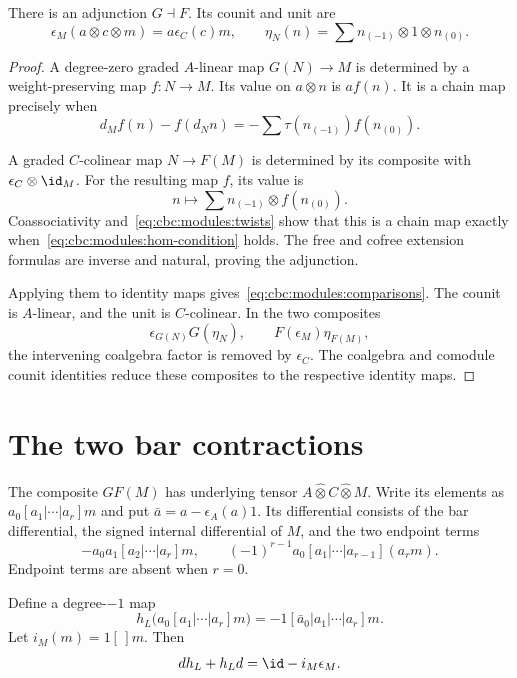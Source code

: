 \begin{proposition}\label{cbc:modules:adjunction}
There is an adjunction $G\dashv F$.
Its counit and unit are
\begin{equation}\label{eq:cbc:modules:comparisons}
 \epsilon_M(a\otimes c\otimes m)=a\epsilon_C(c)m,
 \qquad
 \eta_N(n)=\sum n_{(-1)}\otimes1\otimes n_{(0)}.
\end{equation}
\end{proposition}
\begin{proof}
A degree-zero graded $A$-linear map $G(N)\to M$ is determined by a weight-preserving map $f:N\to M$.
Its value on $a\otimes n$ is $af(n)$.
It is a chain map precisely when
\begin{equation}\label{eq:cbc:modules:hom-condition}
 d_Mf(n)-f(d_Nn)=-\sum\tau(n_{(-1)})f(n_{(0)}).
\end{equation}

A graded $C$-colinear map $N\to F(M)$ is determined by its composite with $\epsilon_C\otimes\id_M$.
For the resulting map $f$, its value is
\[
 n\longmapsto\sum n_{(-1)}\otimes f(n_{(0)}).
\]
Coassociativity and~\eqref{eq:cbc:modules:twists} show that this is a chain map exactly when~\eqref{eq:cbc:modules:hom-condition} holds.
The free and cofree extension formulas are inverse and natural, proving the adjunction.

Applying them to identity maps gives~\eqref{eq:cbc:modules:comparisons}.
The counit is $A$-linear, and the unit is $C$-colinear.
In the two composites
\[
 \epsilon_{G(N)}G(\eta_N),\qquad F(\epsilon_M)\eta_{F(M)},
\]
the intervening coalgebra factor is removed by $\epsilon_C$.
The coalgebra and comodule counit identities reduce these composites to the respective identity maps.
\end{proof}

\section{The two bar contractions}
The composite $G F(M)$ has underlying tensor $A\widehat\otimes C\widehat\otimes M$.
Write its elements as $a_0[a_1|\cdots|a_r]m$ and put $\bar a=a-\epsilon_A(a)1$.
Its differential consists of the bar differential, the signed internal differential of $M$, and the two endpoint terms
\[
 -a_0a_1[a_2|\cdots|a_r]m,
 \qquad
 (-1)^{r-1}a_0[a_1|\cdots|a_{r-1}](a_rm).
\]
Endpoint terms are absent when $r=0$.

Define a degree-$-1$ map
\begin{equation}\label{eq:cbc:modules:left-contraction}
 h_L\bigl(a_0[a_1|\cdots|a_r]m\bigr)
   =-1[\bar a_0|a_1|\cdots|a_r]m.
\end{equation}
Let $i_M(m)=1[\,]m$.
Then
\[
 d h_L+h_Ld=\id-i_M\epsilon_M.
\]


